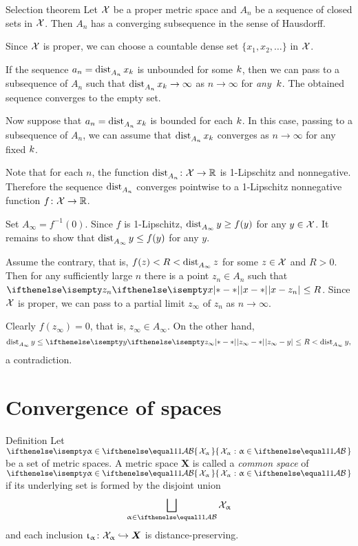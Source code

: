 \begin{thm}{Selection theorem}
Let $\mathcal{X}$ be a proper metric  space
and $A_n$ be a sequence of closed sets in $\mathcal{X}$.
Then  $A_n$ has a converging subsequence in the sense of Hausdorff.
\end{thm}

Since $\mathcal{X}$ is proper,
we can choose a countable dense set $\{x_1,x_2, \dots\}$ in $\mathcal{X}$.

If the sequence $a_n=\mathop{\rm dist}\nolimits_{A_n}^{{}}x_k$ is unbounded for some $k$,
then we can pass to a subsequence of $A_n$ such that 
$\distfun{A_n}x_\kay\to \infty$ as $n\to\infty$ for \emph{any}~$k$.
The obtained sequence converges to the empty set.

Now suppose that $a_n=\mathop{\rm dist}\nolimits_{A_n}^{{}}x_k$ is bounded for each $k$. 
In this case, passing to a subsequence of $A_n$,
we can assume that $\mathop{\rm dist}\nolimits_{A_n}^{{}}x_k$ converges as $n\to\infty$ for any fixed $k$.

Note that for each $n$, the function $\distfun{A_n}\:\spc{X}\to\RR$ is 1-Lipschitz and nonnegative.
Therefore the sequence $\mathop{\rm dist}\nolimits_{A_n}^{{}}$ converges pointwise to a 1-Lipschitz nonnegative function $f\:\spc{X}\to\RR$.

Set $A_\infty=f^{-1}(0)$.
Since $f$ is 1-Lipschitz, 
$\distfun{A_\infty}y\ge f(y)$ for any $y\in \spc{X}$.
It remains to show that $\distfun{A_\infty}y\le f(y)$ for any $y$.

Assume the  contrary,
that is, $f(z)<R<\mathop{\rm dist}\nolimits_{A_\infty}^{{}}z$ for some $z\in \spc{X}$ and $R>0$.
Then for any sufficiently large $n$ there is a point $z_n\in A_n$ such that
$\dist{x}{z_n}{}\le R$.
Since $\mathcal{X}$ is proper, we can pass to a partial limit $z_\infty$ of $z_n$ as $n\to\infty$.

Clearly  $f(z_\infty)=0$, that is, $z_\infty\in A_\infty$.
On the other hand, 
\[\distfun{A_\infty}y\le\dist{z_\infty}{y}{}\le R<\distfun{A_\infty}y,\] 
a contradiction.
\qeds

\section{Convergence of spaces}

\begin{thm}{Definition}\label{def:comp-metr}
Let $\set{\spc{X}_\alpha}{\alpha\in\IndexSet}$ be a set of metric spaces.
A metric space $\bm{X}$
is called a \emph{common space} of $\set{\spc{X}_\alpha}{\alpha\in\IndexSet}$ if its underlying set is formed by the disjoint union
$$\bigsqcup_{\alpha\in\IndexSet} \spc{X}_\alpha$$ 
and each inclusion $\iota_\alpha\:\spc{X}_\alpha\hookrightarrow\bm{X}$
is distance-preserving.
\end{thm}

